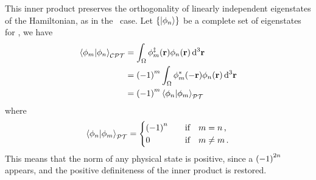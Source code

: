         This inner product preserves the orthogonality of linearly independent eigenstates of the Hamiltonian, as in the \PT\ case. Let $\qty{\ket{\phi_n}}$ be a complete set of eigenstates for \hH, we have
        \begin{align*}
            \braket{\phi_m}{\phi_n}_{\CPT}
            &= \int\nolimits_\Omega \phi^\myconj_m\pqty{\vb{r}} \phi_n\pqty{\vb{r}} \dd[3]{\vb{r}} \\
            &= \pqty{-1}^m \int\nolimits_\Omega  \phi_m^*\pqty{-\vb{r}} \phi_n\pqty{\vb{r}} \dd[3]{\vb{r}} \\
            &= \pqty{-1}^m \braket{\phi_n}{\phi_m}_{\PT}
        \end{align*}
        where
        \begin{equation*}
            \braket{\phi_n}{\phi_m}_{\PT} = 
            \begin{cases}
                \pqty{-1}^n &\qif m = n
                \mycomma 
                \\
                0 &\qif m \neq m
                \myperiod
            \end{cases}
        \end{equation*}
        This means that the norm of any physical state is positive, since a $\pqty{-1}^{2n}$ appears, and the positive definiteness of the inner product is restored.

